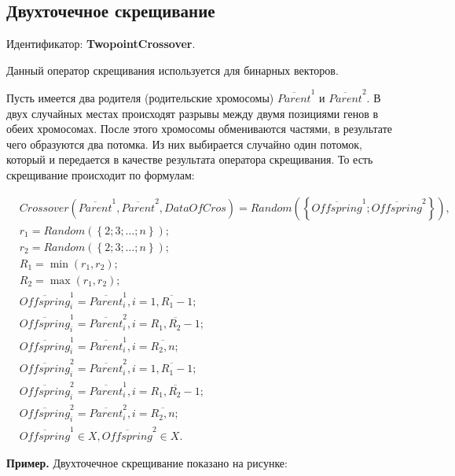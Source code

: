 \subsection{Двухточечное скрещивание}\label{SetOfOperatorsAlgorithms:TwopointCrossover}

Идентификатор: \textbf{TwopointCrossover}.

Данный оператор скрещивания используется для бинарных векторов.

Пусть имеется два родителя (родительские хромосомы) $\overline{Parent}^1$ и $\overline{Parent}^2$. В двух случайных местах происходят разрывы между двумя позициями генов в обеих хромосомах. После этого хромосомы обмениваются частями, в результате чего образуются два потомка. Из них выбирается случайно один потомок, который и передается в качестве результата оператора скрещивания. То есть скрещивание происходит по формулам:

\begin{align}
\label{SetOfOperatorsAlgorithms:eq:TwopointCrossover}
&Crossover \left( \overline{Parent}^1, \overline{Parent}^2, DataOfCros\right)=Random \left(\left\lbrace \overline{Offspring}^1; \overline{Offspring}^2\right\rbrace  \right), \\
&r_1=Random\left( \left\lbrace 2; 3; \ldots; n\right\rbrace \right); \nonumber \\
&r_2=Random\left( \left\lbrace 2; 3; \ldots; n\right\rbrace \right); \nonumber \\
&R_1=\min \left( r_1, r_2\right) ; \nonumber \\
&R_2=\max \left( r_1, r_2\right) ; \nonumber \\
& \overline{Offspring}^1_i=\overline{Parent}^1_i, i=\overline{1,R_1-1};\nonumber\\
& \overline{Offspring}^1_i=\overline{Parent}^2_i, i=\overline{R_1,R_2-1};\nonumber\\
&  \overline{Offspring}^1_i=\overline{Parent}^1_i, i=\overline{R_2,n};\nonumber\\
& \overline{Offspring}^2_i=\overline{Parent}^2_i, i=\overline{1,R_1-1};\nonumber\\
& \overline{Offspring}^2_i=\overline{Parent}^1_i, i=\overline{R_1,R_2-1};\nonumber\\
&  \overline{Offspring}^2_i=\overline{Parent}^2_i, i=\overline{R_2,n};\nonumber\\
&\overline{Offspring}^1\in X, \overline{Offspring}^2\in X.\nonumber
\end{align}

\textbf{Пример.} Двухточечное скрещивание показано на рисунке:

